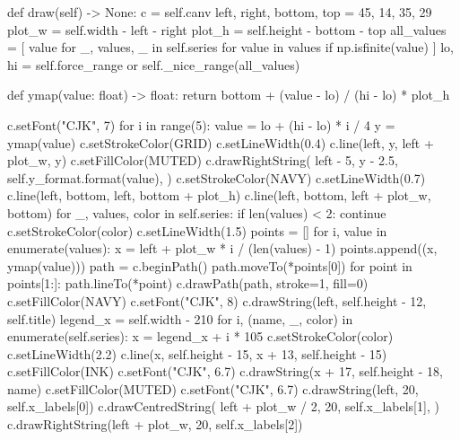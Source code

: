 \documentclass[UTF8,a4paper,fontset=fandol]{ctexart}
\begin{document}
\begin{ProjectCode}
    def draw(self) -> None:
        c = self.canv
        left, right, bottom, top = 45, 14, 35, 29
        plot_w = self.width - left - right
        plot_h = self.height - bottom - top
        all_values = [
            value
            for _, values, _ in self.series
            for value in values
            if np.isfinite(value)
        ]
        lo, hi = self.force_range or self._nice_range(all_values)

        def ymap(value: float) -> float:
            return bottom + (value - lo) / (hi - lo) * plot_h

        c.setFont("CJK", 7)
        for i in range(5):
            value = lo + (hi - lo) * i / 4
            y = ymap(value)
            c.setStrokeColor(GRID)
            c.setLineWidth(0.4)
            c.line(left, y, left + plot_w, y)
            c.setFillColor(MUTED)
            c.drawRightString(
                left - 5,
                y - 2.5,
                self.y_format.format(value),
            )
        c.setStrokeColor(NAVY)
        c.setLineWidth(0.7)
        c.line(left, bottom, left, bottom + plot_h)
        c.line(left, bottom, left + plot_w, bottom)
        for _, values, color in self.series:
            if len(values) < 2:
                continue
            c.setStrokeColor(color)
            c.setLineWidth(1.5)
            points = []
            for i, value in enumerate(values):
                x = left + plot_w * i / (len(values) - 1)
                points.append((x, ymap(value)))
            path = c.beginPath()
            path.moveTo(*points[0])
            for point in points[1:]:
                path.lineTo(*point)
            c.drawPath(path, stroke=1, fill=0)
        c.setFillColor(NAVY)
        c.setFont("CJK", 8)
        c.drawString(left, self.height - 12, self.title)
        legend_x = self.width - 210
        for i, (name, _, color) in enumerate(self.series):
            x = legend_x + i * 105
            c.setStrokeColor(color)
            c.setLineWidth(2.2)
            c.line(x, self.height - 15, x + 13, self.height - 15)
            c.setFillColor(INK)
            c.setFont("CJK", 6.7)
            c.drawString(x + 17, self.height - 18, name)
        c.setFillColor(MUTED)
        c.setFont("CJK", 6.7)
        c.drawString(left, 20, self.x_labels[0])
        c.drawCentredString(
            left + plot_w / 2,
            20,
            self.x_labels[1],
        )
        c.drawRightString(left + plot_w, 20, self.x_labels[2])



\end{ProjectCode}
\end{document}
